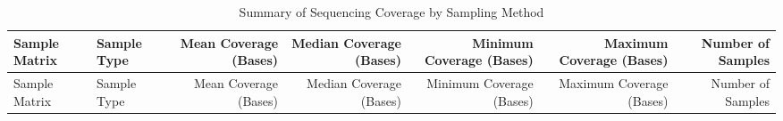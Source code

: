 \documentclass[
]{article}
\begin{document}
\begin{longtable}[]{@{}llrrrrr@{}}
\caption{Summary of Sequencing Coverage by Sampling
Method}\tabularnewline
\toprule
\begin{minipage}[b]{0.10\columnwidth}\raggedright
Sample Matrix\strut
\end{minipage} & \begin{minipage}[b]{0.07\columnwidth}\raggedright
Sample Type\strut
\end{minipage} & \begin{minipage}[b]{0.12\columnwidth}\raggedleft
Mean Coverage (Bases)\strut
\end{minipage} & \begin{minipage}[b]{0.13\columnwidth}\raggedleft
Median Coverage (Bases)\strut
\end{minipage} & \begin{minipage}[b]{0.14\columnwidth}\raggedleft
Minimum Coverage (Bases)\strut
\end{minipage} & \begin{minipage}[b]{0.14\columnwidth}\raggedleft
Maximum Coverage (Bases)\strut
\end{minipage} & \begin{minipage}[b]{0.10\columnwidth}\raggedleft
Number of Samples\strut
\end{minipage}\tabularnewline
\midrule
\endfirsthead
\toprule
\begin{minipage}[b]{0.10\columnwidth}\raggedright
Sample Matrix\strut
\end{minipage} & \begin{minipage}[b]{0.07\columnwidth}\raggedright
Sample Type\strut
\end{minipage} & \begin{minipage}[b]{0.12\columnwidth}\raggedleft
Mean Coverage (Bases)\strut
\end{minipage} & \begin{minipage}[b]{0.13\columnwidth}\raggedleft
Median Coverage (Bases)\strut
\end{minipage} & \begin{minipage}[b]{0.14\columnwidth}\raggedleft
Minimum Coverage (Bases)\strut
\end{minipage} & \begin{minipage}[b]{0.14\columnwidth}\raggedleft
Maximum Coverage (Bases)\strut
\end{minipage} & \begin{minipage}[b]{0.10\columnwidth}\raggedleft
Number of Samples\strut
\end{minipage}\tabularnewline

\end{longtable}
\end{document}
